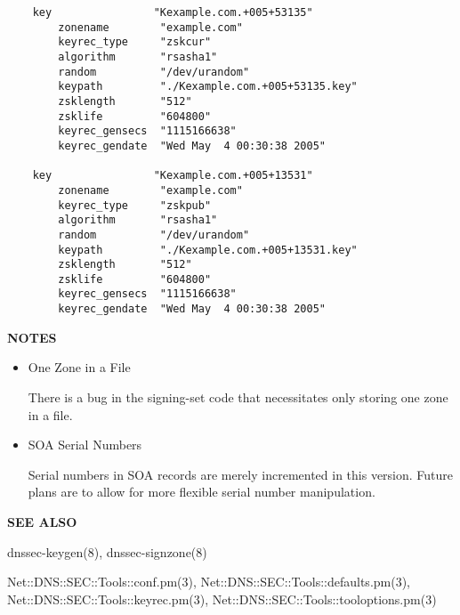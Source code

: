 \begin{verbatim}
    key                "Kexample.com.+005+53135"
        zonename        "example.com"
        keyrec_type     "zskcur"
        algorithm       "rsasha1"
        random          "/dev/urandom"
        keypath         "./Kexample.com.+005+53135.key"
        zsklength       "512"
        zsklife         "604800"
        keyrec_gensecs  "1115166638"
        keyrec_gendate  "Wed May  4 00:30:38 2005"

    key                "Kexample.com.+005+13531"
        zonename        "example.com"
        keyrec_type     "zskpub"
        algorithm       "rsasha1"
        random          "/dev/urandom"
        keypath         "./Kexample.com.+005+13531.key"
        zsklength       "512"
        zsklife         "604800"
        keyrec_gensecs  "1115166638"
        keyrec_gendate  "Wed May  4 00:30:38 2005"
\end{verbatim}

{\bf NOTES}

\begin{itemize}

\item One Zone in a  File\verb" "

There is a bug in the signing-set code that necessitates only storing one
zone in a  file.

\item SOA Serial Numbers\verb" "

Serial numbers in SOA records are merely incremented in this version.
Future plans are to allow for more flexible serial number manipulation.

\end{itemize}

{\bf SEE ALSO}

dnssec-keygen(8),
dnssec-signzone(8)

Net::DNS::SEC::Tools::conf.pm(3),
Net::DNS::SEC::Tools::defaults.pm(3),\\
Net::DNS::SEC::Tools::keyrec.pm(3),
Net::DNS::SEC::Tools::tooloptions.pm(3)

